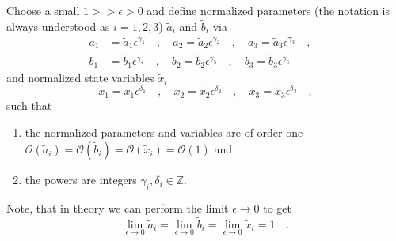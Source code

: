 	Choose a small $1>> \epsilon > 0$ and define normalized parameters (the notation is 
	always understood as $i=1,2,3$)  
	$\tilde{a}_i$ and $\tilde{b}_i$ via
	\begin{equation}\begin{aligned}
	a_1&=\tilde{a}_1 \epsilon^{\gamma_1} \quad , \quad 
	a_2=\tilde{a}_2 \epsilon^{\gamma_2}\quad , \quad 
	a_3=\tilde{a}_3 \epsilon^{\gamma_3}\quad , \quad  \\
	b_1&=\tilde{b}_1 \epsilon^{\gamma_4} \quad , \quad 
	b_2=\tilde{b}_2 \epsilon^{\gamma_5}\quad , \quad 
	b_3=\tilde{b}_3 \epsilon^{\gamma_6}
	\end{aligned}
	\end{equation}	 
	and normalized state variables $\tilde{x}_i$
	\begin{equation}
	x_1=\tilde{x}_1 \epsilon^{\delta_1} \quad , \quad 
	x_2=\tilde{x}_2 \epsilon^{\delta_2}\quad , \quad 
	x_3=\tilde{x}_3 \epsilon^{\delta_3} \quad ,
	\end{equation}
	such that
	\begin{enumerate}
	\item the normalized parameters and variables are of order one\\ 
	$\mathcal{O}(\tilde{a}_i)=\mathcal{O}(\tilde{b}_i)=
	\mathcal{O}(\tilde{x}_i)=\mathcal{O}(1)$ and
	\item the powers are integers $\gamma_i,\delta_i\in \mathbb{Z}$.
	\end{enumerate}
	Note, that in theory we can perform the limit $\epsilon \to 0$ to get
	\begin{equation}
		\lim\limits_{\epsilon \to 0} \tilde{a}_i = \lim\limits_{\epsilon \to 0} 
		\tilde{b}_i = \lim\limits_{\epsilon \to 0} \tilde{x}_i = 1 \quad .
	\end{equation}
	
